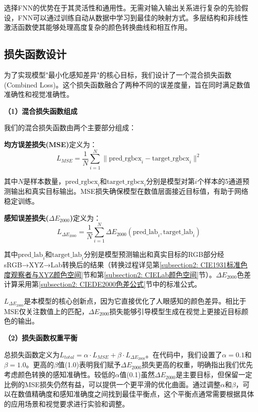 选择FNN的优势在于其灵活性和通用性。无需对输入输出关系进行复杂的先验假设，FNN可以通过训练自动从数据中学习到最佳的映射方式。多层结构和非线性激活函数使其能够处理高度复杂的颜色转换曲线和相互作用。\cite{1024493909.nh}

\subsection[\hspace{-2pt}损失函数设计]{{\heiti{} \hspace{-8pt}损失函数设计}}\label{section2: 损失函数设计}

为了实现模型"最小化感知差异"的核心目标，我们设计了一个混合损失函数 (Combined Loss)。这个损失函数融合了两种不同的误差度量，旨在同时满足数值准确性和视觉准确性。

\noindent\textbf{（1）混合损失函数组成}

我们的混合损失函数由两个主要部分组成：

\textbf{均方误差损失(MSE)}定义为：
\begin{equation}
L_{MSE} = \frac{1}{N} \sum_{i=1}^N \| \text{pred\_rgbcx}_i - \text{target\_rgbcx}_i \|^2
\end{equation}

其中$N$是样本数量，$\text{pred\_rgbcx}_i$和$\text{target\_rgbcx}_i$分别是模型对第$i$个样本的5通道预测输出和真实目标输出。MSE损失确保模型在数值层面接近目标值，有助于网络稳定训练。

\textbf{感知误差损失($\Delta E_{2000}$)}定义为：
\begin{equation}
L_{\Delta E_{2000}} = \frac{1}{N} \sum_{i=1}^N \Delta E_{2000}(\text{pred\_lab}_i, \text{target\_lab}_i)
\end{equation}

其中$\text{pred\_lab}_i$和$\text{target\_lab}_i$分别是模型预测输出和真实目标的RGB部分经sRGB→XYZ→Lab转换后的结果（转换过程详见第\ref{subsection2: CIE1931标准色度观察者与XYZ颜色空间}节和第\ref{subsection2: CIELab颜色空间}节）。$\Delta E_{2000}$色差计算采用第\ref{subsection2: CIEDE2000色差公式}节中的标准公式。

$L_{\Delta E_{2000}}$是本模型的核心创新点，因为它直接优化了人眼感知的颜色差异。相比于MSE仅关注数值上的匹配，$\Delta E_{2000}$损失能够引导模型生成在视觉上更接近目标颜色的输出。

\noindent\textbf{（2）损失函数权重平衡}

总损失函数定义为$ L_{total} = \alpha \cdot L_{MSE} + \beta \cdot L_{\Delta E_{2000}} $。在代码中，我们设置了$\alpha=0.1$和$\beta=1.0$。更高的$\beta$值(1.0)表明我们赋予$\Delta E_{2000}$损失更高的权重，明确指出我们优先考虑颜色转换的感知准确性。较低的$\alpha$值(0.1)虽然$\Delta E_{2000}$是主要目标，但保留一定比例的MSE损失仍然有益，可以提供一个更平滑的优化曲面。通过调整$\alpha$和$\beta$，可以在数值精确度和感知准确度之间找到最佳平衡点，这个平衡点通常需要根据具体的应用场景和视觉要求进行实验和调整。

